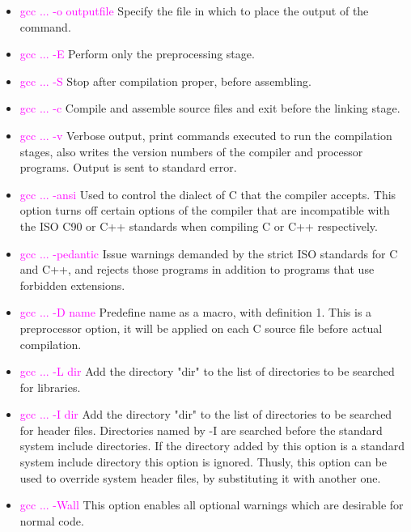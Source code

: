 \documentclass[a4paper,10pt]{article}
\begin{document}
\begin{itemize}
\item \textcolor{magenta}{gcc ... -o outputfile} Specify the file in which to place the output of the command.
\item \textcolor{magenta}{gcc ... -E} Perform only the preprocessing stage.

\item \textcolor{magenta}{gcc ... -S} Stop after compilation proper, before assembling.

\item \textcolor{magenta}{gcc ... -c} Compile and assemble source files and exit before the linking stage. 

\item \textcolor{magenta}{gcc ... -v} Verbose output, print commands executed to run the compilation stages, also writes the version numbers of the compiler and processor programs. Output is sent to standard error.

\item \textcolor{magenta}{gcc ... -ansi} Used to control the dialect of C that the compiler accepts. This option turns off certain options of the compiler that are incompatible with the ISO C90 or C++ standards when compiling C or C++ respectively.

\item \textcolor{magenta}{gcc ... -pedantic} Issue warnings demanded by the strict ISO standards for C and C++, and rejects those programs in addition to programs that use forbidden extensions.

\item \textcolor{magenta}{gcc ... -D name} Predefine name as a macro, with definition 1. This is a preprocessor option, it will be applied on each C source file before actual compilation.

\item \textcolor{magenta}{gcc ... -L dir} Add the directory "dir" to the list of directories to be searched for libraries.

\item \textcolor{magenta}{gcc ... -I dir} Add the directory "dir" to the list of directories to be searched for header files. Directories named by -I are searched before the standard system include directories. If the directory added by this option is a standard system include directory this option is ignored. Thusly, this option can be used to override system header files, by substituting it with another one. 

\item \textcolor{magenta}{gcc ... -Wall} This option enables all optional warnings which are desirable for normal code.


\end{itemize}
\end{document}
